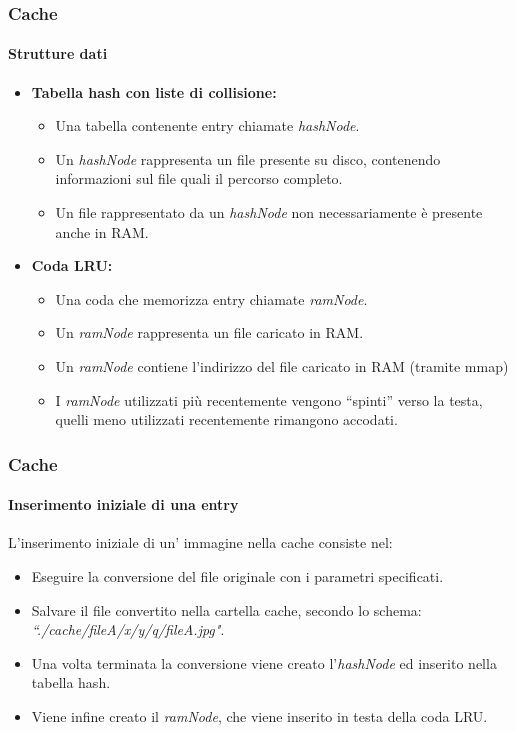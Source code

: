\documentclass{beamer}
\begin{document}
\begin{frame}
\frametitle{Cache}
\framesubtitle{Strutture dati}
\begin{itemize}
\item \textbf{Tabella hash con liste di collisione:}
\begin{itemize}
\item Una tabella contenente entry chiamate \textit{hashNode}.
\item Un \textit{hashNode} rappresenta un file presente su disco, contenendo informazioni
sul file quali il percorso completo.
\item Un file rappresentato da un \textit{hashNode} non necessariamente è presente anche
in RAM.
\end{itemize}
\end{itemize}



\begin{itemize}
\item \textbf{Coda LRU:}
\begin{itemize}
\item Una coda che memorizza entry chiamate \textit{ramNode}.
\item Un \textit{ramNode} rappresenta un file caricato in RAM.
\item Un \textit{ramNode} contiene l'indirizzo del file caricato in RAM (tramite mmap)
\item I \textit{ramNode} utilizzati più recentemente vengono “spinti” verso la testa, quelli
meno utilizzati recentemente rimangono accodati.
\end{itemize}
\end{itemize}
\end{frame}
\begin{frame}
\frametitle{Cache}
\framesubtitle{Inserimento iniziale di una entry}

L'inserimento iniziale di un' immagine nella cache consiste nel:


\begin{itemize}
\item Eseguire la conversione del file originale con i parametri specificati.
\item Salvare il file convertito nella cartella cache, secondo lo schema: \textit{“./cache/fileA/x/y/q/fileA.jpg"}.

\item Una volta terminata la conversione viene creato l'\textit{hashNode} ed inserito nella
tabella hash.
\item Viene infine creato il \textit{ramNode}, che viene inserito in testa della coda LRU.
\end{itemize}
\end{frame}
\end{document}

